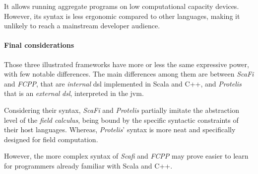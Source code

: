 It allows running aggregate programs on low computational capacity devices.
However, its syntax is less ergonomic compared to other languages, making it unlikely to reach a mainstream developer audience.

\paragraph{Final considerations}
Those three illustrated frameworks have more or less the same expressive power, with few notable differences.
The main differences among them are between \emph{ScaFi} and \emph{FCPP}, that are \emph{internal} \ac{dsl} implemented in Scala
and C++, and \emph{Protelis} that is an \emph{external} \emph{dsl}, interpreted in the \ac{jvm}.

Considering their syntax, \emph{ScaFi} and \emph{Protelis} partially imitate the abstraction level of the \emph{field calculus},
being bound by the specific syntactic constraints of their host languages.
Whereas, \emph{Protelis}' syntax is more neat and specifically designed for field computation.

However, the more complex syntax of \emph{Scafi} and \emph{FCPP} may prove easier to learn for programmers already familiar with Scala and C++.